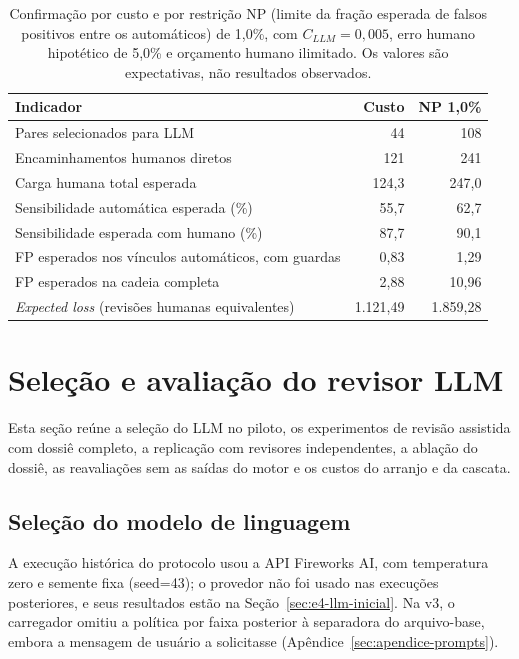 \begin{table}[!htbp]
\centering
\caption{Confirmação por custo e por restrição NP (limite da fração esperada de falsos positivos entre os automáticos) de 1,0\%, com $C_{LLM}=0{,}005$, erro humano hipotético de 5,0\% e orçamento humano ilimitado. Os valores são expectativas, não resultados observados.}
\label{tab:cap8-np-confirmacao}
\begin{tabular}{lrr}
\hline
Indicador & Custo & NP 1,0\% \\
\hline
Pares selecionados para LLM & 44 & 108 \\
Encaminhamentos humanos diretos & 121 & 241 \\
Carga humana total esperada & 124,3 & 247,0 \\
Sensibilidade automática esperada (\%) & 55,7 & 62,7 \\
Sensibilidade esperada com humano (\%) & 87,7 & 90,1 \\
FP esperados nos vínculos automáticos, com guardas & 0,83 & 1,29 \\
FP esperados na cadeia completa & 2,88 & 10,96 \\
\textit{Expected loss} (revisões humanas equivalentes) & 1.121,49 & 1.859,28 \\
\hline
\end{tabular}
\end{table}

\section{Seleção e avaliação do revisor LLM}\label{sec:e4-ap-revisor}

Esta seção reúne a seleção do LLM no piloto, os experimentos de revisão assistida com dossiê completo, a replicação com revisores independentes, a ablação do dossiê, as reavaliações sem as saídas do motor e os custos do arranjo e da cascata.

\subsection{Seleção do modelo de linguagem}\label{sec:e4-selecao-llm}

A execução histórica do protocolo usou a API Fireworks AI, com temperatura zero e semente fixa (seed=43); o provedor não foi usado nas execuções posteriores, e seus resultados estão na Seção~\ref{sec:e4-llm-inicial}. Na v3, o carregador omitiu a política por faixa posterior à separadora do arquivo-base, embora a mensagem de usuário a solicitasse (Apêndice~\ref{sec:apendice-prompts}).

